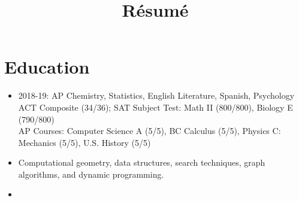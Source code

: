 \documentclass[11pt,a4paper,sans]{moderncv}        %
\title{R\'{e}sum\'{e}}                               %
\begin{document}
\makecvtitle

\section{Education}
\vspace{5pt}
\begin{itemize}
\item{
{\vspace{3pt}
2018-19: AP Chemistry, Statistics, English Literature, Spanish, Psychology\\
ACT Composite (34/36); SAT Subject Test: Math II (800/800), Biology E (790/800)\\
AP Courses: Computer Science A (5/5), BC Calculus (5/5), Physics C: Mechanics (5/5), U.S. History (5/5)}}
\item {}
{\vspace{3pt}
Computational geometry,  data structures, search techniques, graph algorithms, and dynamic programming.}
\item {}
\end{itemize}
\end{document}

